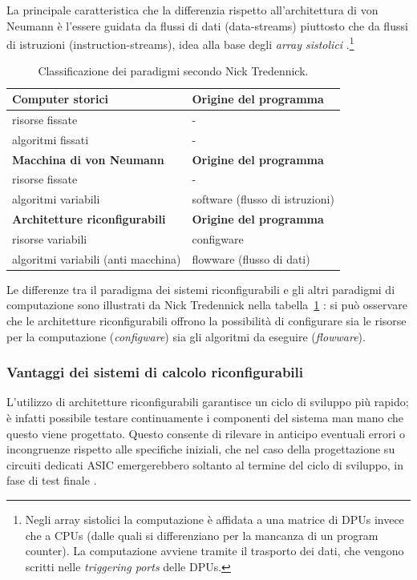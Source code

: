 La principale caratteristica che la differenzia rispetto all'architettura di von Neumann è
l'essere guidata da flussi di dati (data-streams) piuttosto che da flussi di istruzioni
(instruction-streams), idea alla base degli \emph{array sistolici}
\cite{SystolicArraysConceptImplementation}.\footnote{Negli array
sistolici la computazione è affidata a una matrice di \acp{DPU} invece che a \acsp{CPU}
(dalle quali si differenziano per la mancanza di un program counter). La computazione
avviene tramite il trasporto dei dati, che vengono scritti nelle \emph{triggering ports}
delle \acp{DPU}.}



\begin{table}[ht]
\begin{center}
 \begin{tabular}{l | l}
 \hline
 \textbf{Computer storici} & \textbf{Origine del programma}\\
 \hline
 risorse fissate & -\\
 algoritmi fissati & -\\
 \hline
 \textbf{Macchina di von Neumann} & \textbf{Origine del programma}\\
 \hline
 risorse fissate & -\\
 algoritmi variabili & software (flusso di istruzioni)\\
 \hline
 \textbf{Architetture riconfigurabili} & \textbf{Origine del programma}\\
 \hline
 risorse variabili & configware\\
 algoritmi variabili (anti macchina) & flowware (flusso di dati)
 \end{tabular}
 \caption{Classificazione dei paradigmi secondo Nick Tredennick.}
 \label{tab:TredennickClassificationScheme}
 \end{center}
\end{table}

Le differenze tra il paradigma dei sistemi riconfigurabili e gli altri paradigmi di
computazione sono illustrati da Nick Tredennick nella
tabella~\ref{tab:TredennickClassificationScheme} \cite{TredennickClassification}: si può
osservare che le architetture riconfigurabili offrono la possibilità di configurare sia le
risorse per la computazione (\emph{configware}) sia gli algoritmi da eseguire
(\emph{flowware}). 

\subsubsection{Vantaggi dei sistemi di calcolo riconfigurabili}
L'utilizzo di architetture riconfigurabili garantisce un ciclo di sviluppo pi\`u rapido;
\`e infatti possibile testare continuamente i componenti del sistema man mano che questo viene
progettato. Questo consente di rilevare in anticipo eventuali errori o incongruenze rispetto alle
specifiche iniziali, che nel caso della progettazione su circuiti dedicati \ac{ASIC} emergerebbero
soltanto al termine del ciclo di sviluppo, in fase di test finale \cite{ReconfigurableSystemDesignVerification}.

